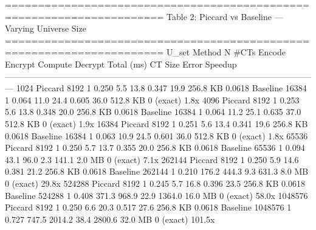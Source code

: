 ======================================================================
  Table 2: Piccard vs Baseline — Varying Universe Size
======================================================================
    U_set    Method        N  #CTs  Encode  Encrypt  Compute  Decrypt  Total (ms)   CT Size      Error  Speedup
---------------------------------------------------------------------------------------------------------------
     1024   Piccard     8192     1   0.250      5.5     13.8    0.347        19.9  256.8 KB     0.0618         
           Baseline    16384     1   0.064     11.0     24.4    0.605        36.0  512.8 KB  0 (exact)     1.8x
     4096   Piccard     8192     1   0.253      5.6     13.8    0.348        20.0  256.8 KB     0.0618         
           Baseline    16384     1   0.064     11.2     25.1    0.635        37.0  512.8 KB  0 (exact)     1.9x
    16384   Piccard     8192     1   0.251      5.6     13.4    0.341        19.6  256.8 KB     0.0618         
           Baseline    16384     1   0.063     10.9     24.5    0.601        36.0  512.8 KB  0 (exact)     1.8x
    65536   Piccard     8192     1   0.250      5.7     13.7    0.355        20.0  256.8 KB     0.0618         
           Baseline    65536     1   0.094     43.1     96.0      2.3       141.1    2.0 MB  0 (exact)     7.1x
   262144   Piccard     8192     1   0.250      5.9     14.6    0.381        21.2  256.8 KB     0.0618         
           Baseline   262144     1   0.210    176.2    444.3      9.3       631.3    8.0 MB  0 (exact)    29.8x
   524288   Piccard     8192     1   0.245      5.7     16.8    0.396        23.5  256.8 KB     0.0618         
           Baseline   524288     1   0.408    371.3    968.9     22.9      1364.0   16.0 MB  0 (exact)    58.0x
  1048576   Piccard     8192     1   0.250      6.6     20.3    0.517        27.6  256.8 KB     0.0618         
           Baseline  1048576     1   0.727    747.5   2014.2     38.4      2800.6   32.0 MB  0 (exact)   101.5x

